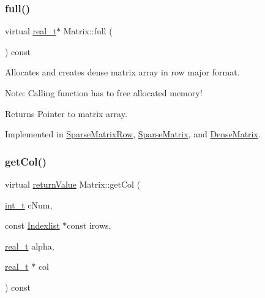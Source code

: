 \subsubsection{\texorpdfstring{full()}{full()}}
{\footnotesize\ttfamily virtual \hyperlink{qp_o_a_s_e_s__wrapper_8h_a0d00e2b3dfadee81331bbb39068570c4}{real\+\_\+t}$\ast$ Matrix\+::full (\begin{DoxyParamCaption}{ }\end{DoxyParamCaption}) const\hspace{0.3cm}{\ttfamily [pure virtual]}}

Allocates and creates dense matrix array in row major format.

Note\+: Calling function has to free allocated memory!

\begin{DoxyReturn}{Returns}
Pointer to matrix array. 
\end{DoxyReturn}


Implemented in \hyperlink{class_sparse_matrix_row_ae074d0a3c434867b07552401e9b3174d}{Sparse\+Matrix\+Row}, \hyperlink{class_sparse_matrix_a9ade370eadd43330336498cde4c3b3a7}{Sparse\+Matrix}, and \hyperlink{class_dense_matrix_abde94ef6ed541004e664a655a4bd2e3e}{Dense\+Matrix}.

\mbox{\label{class_matrix_a719d13204e07de9c017cc68909b6db42}} 
\subsubsection{\texorpdfstring{get\+Col()}{getCol()}}
{\footnotesize\ttfamily virtual \hyperlink{_message_handling_8hpp_a81d556f613bfbabd0b1f9488c0fa865e}{return\+Value} Matrix\+::get\+Col (\begin{DoxyParamCaption}\item[{\hyperlink{_types_8hpp_ab6fd6105e64ed14a0c9281326f05e623}{int\+\_\+t}}]{c\+Num,  }\item[{const \hyperlink{class_indexlist}{Indexlist} $\ast$const}]{irows,  }\item[{\hyperlink{qp_o_a_s_e_s__wrapper_8h_a0d00e2b3dfadee81331bbb39068570c4}{real\+\_\+t}}]{alpha,  }\item[{\hyperlink{qp_o_a_s_e_s__wrapper_8h_a0d00e2b3dfadee81331bbb39068570c4}{real\+\_\+t} $\ast$}]{col }\end{DoxyParamCaption}) const\hspace{0.3cm}{\ttfamily [pure virtual]}}

